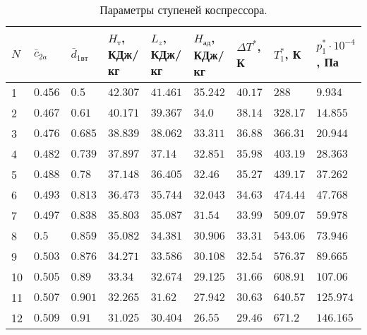 \documentclass[a4paper,10pt]{article}
\begin{document}
    \begin{longtable}{|p{0.7cm}|p{1.2cm}|p{1.2cm}|p{1.2cm}|p{1.1cm}|p{1.1cm}|p{1.1cm}|p{1.1cm}|p{1.1cm}|}
        \caption{Параметры ступеней коспрессора.}\\ \hline
        $N$ & $\bar{c}_{2a}$ & $\bar{d}_{1вт}$ & $H_т$, КДж/кг & $L_z$, КДж/кг & $H_{ад}$, КДж/кг & $\Delta T^*$, К & $T_1^*$, К&
        $p_1^* \cdot 10^{-4}$, Па   \\ \hline
%        
        1 & $0.456$ & $0.5$ &
        $42.307$ &
        $41.461$ & $35.242$ &
        $40.17$ & $288$ &
        $9.934$  \\ \hline
%        
        2 & $0.467$ & $0.61$ &
        $40.171$ &
        $39.367$ & $34.0$ &
        $38.14$ & $328.17$ &
        $14.855$  \\ \hline
%        
        3 & $0.476$ & $0.685$ &
        $38.839$ &
        $38.062$ & $33.311$ &
        $36.88$ & $366.31$ &
        $20.944$  \\ \hline
%        
        4 & $0.482$ & $0.739$ &
        $37.897$ &
        $37.14$ & $32.851$ &
        $35.98$ & $403.19$ &
        $28.363$  \\ \hline
%        
        5 & $0.488$ & $0.78$ &
        $37.148$ &
        $36.405$ & $32.46$ &
        $35.27$ & $439.17$ &
        $37.262$  \\ \hline
%        
        6 & $0.493$ & $0.813$ &
        $36.473$ &
        $35.744$ & $32.043$ &
        $34.63$ & $474.44$ &
        $47.768$  \\ \hline
%        
        7 & $0.497$ & $0.838$ &
        $35.803$ &
        $35.087$ & $31.54$ &
        $33.99$ & $509.07$ &
        $59.978$  \\ \hline
%        
        8 & $0.5$ & $0.859$ &
        $35.082$ &
        $34.381$ & $30.906$ &
        $33.31$ & $543.06$ &
        $73.946$  \\ \hline
%        
        9 & $0.503$ & $0.876$ &
        $34.271$ &
        $33.586$ & $30.108$ &
        $32.54$ & $576.37$ &
        $89.665$  \\ \hline
%        
        10 & $0.505$ & $0.89$ &
        $33.34$ &
        $32.674$ & $29.125$ &
        $31.66$ & $608.91$ &
        $107.06$  \\ \hline
%        
        11 & $0.507$ & $0.901$ &
        $32.265$ &
        $31.62$ & $27.942$ &
        $30.63$ & $640.57$ &
        $125.974$  \\ \hline
%        
        12 & $0.509$ & $0.91$ &
        $31.025$ &
        $30.404$ & $26.55$ &
        $29.46$ & $671.2$ &
        $146.165$  \\ \hline
%        
    \end{longtable}
\end{document}
